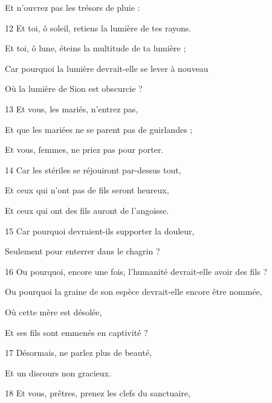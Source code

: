 \par Et n'ouvrez pas les trésors de pluie :

\par 12 Et toi, ô soleil, retiens la lumière de tes rayons.

\par Et toi, ô lune, éteins la multitude de ta lumière ;

\par Car pourquoi la lumière devrait-elle se lever à nouveau

\par Où la lumière de Sion est obscurcie ?

\par 13 Et vous, les mariés, n'entrez pas,

\par Et que les mariées ne se parent pas de guirlandes ;

\par Et vous, femmes, ne priez pas pour porter.

\par 14 Car les stériles se réjouiront par-dessus tout,

\par Et ceux qui n'ont pas de fils seront heureux,

\par Et ceux qui ont des fils auront de l'angoisse.

\par 15 Car pourquoi devraient-ils supporter la douleur,

\par Seulement pour enterrer dans le chagrin ?

\par 16 Ou pourquoi, encore une fois, l'humanité devrait-elle avoir des fils ?

\par Ou pourquoi la graine de son espèce devrait-elle encore être nommée,

\par Où cette mère est désolée,

\par Et ses fils sont emmenés en captivité ?

\par 17 Désormais, ne parlez plus de beauté,

\par Et un discours non gracieux.

\par 18 Et vous, prêtres, prenez les clefs du sanctuaire,

